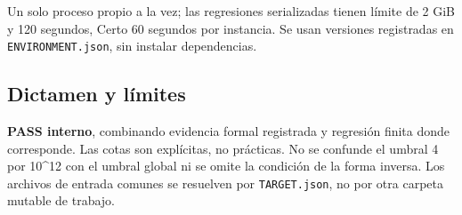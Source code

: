 Un solo proceso propio a la vez; las regresiones serializadas tienen
límite de 2 GiB y 120 segundos, Certo 60 segundos por instancia. Se usan
versiones registradas en \texttt{ENVIRONMENT.json}, sin instalar
dependencias.

\subsection{Dictamen y límites}\label{dictamen-y-luxedmites}

\textbf{PASS interno}, combinando evidencia formal registrada y
regresión finita donde corresponde. Las cotas son explícitas, no
prácticas. No se confunde el umbral 4 por 10\^{}12 con el umbral global
ni se omite la condición de la forma inversa. Los archivos de entrada
comunes se resuelven por \texttt{TARGET.json}, no por otra carpeta
mutable de trabajo.
